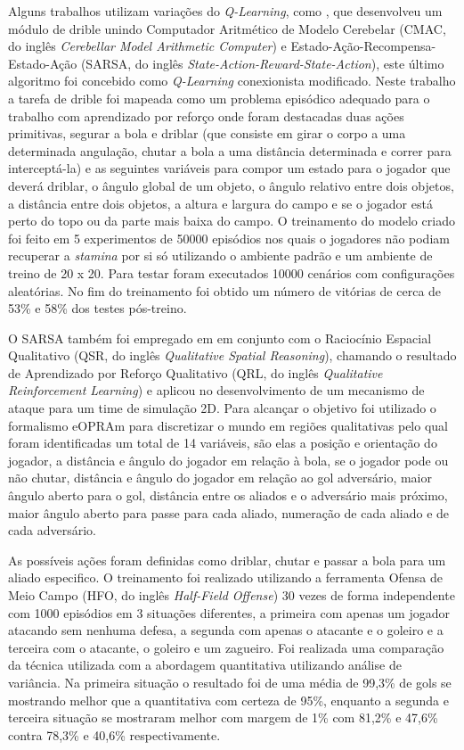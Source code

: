 Alguns trabalhos utilizam variações do \textit{Q-Learning}, como
, que desenvolveu um módulo de drible unindo Computador
Aritmético de Modelo Cerebelar (CMAC, do inglês \textit{Cerebellar Model Arithmetic Computer}) e
Estado-Ação-Recompensa-Estado-Ação (SARSA, do inglês \textit{State-Action-Reward-State-Action}),
este último algoritmo foi concebido como \textit{Q-Learning} conexionista modificado. Neste trabalho
a tarefa de drible foi mapeada como um problema episódico adequado para o trabalho com aprendizado
por reforço onde foram destacadas duas ações primitivas, segurar a bola e driblar (que consiste em
girar o corpo a uma determinada angulação, chutar a bola a uma distância determinada e correr para
interceptá-la) e as seguintes variáveis para compor um estado para o jogador que deverá driblar, o
ângulo global de um objeto, o ângulo relativo entre dois objetos, a distância entre dois objetos, a
altura e largura do campo e se o jogador está perto do topo ou da parte mais baixa do campo. O
treinamento do modelo criado foi feito em 5 experimentos de 50000 episódios nos quais o jogadores
não podiam recuperar a \textit{stamina} por si só utilizando o ambiente padrão e um ambiente de
treino de 20 x 20. Para testar foram executados 10000 cenários com configurações aleatórias. No fim
do treinamento foi obtido um número de vitórias de cerca de 53\% e 58\% dos testes pós-treino.

O SARSA também foi empregado em  em conjunto com o Raciocínio
Espacial Qualitativo (QSR, do inglês \textit{Qualitative Spatial Reasoning}), chamando o resultado
de Aprendizado por Reforço Qualitativo (QRL, do inglês \textit{Qualitative Reinforcement Learning})
e aplicou no desenvolvimento de um mecanismo de ataque para um time de simulação 2D. Para alcançar o
objetivo foi utilizado o formalismo eOPRAm para discretizar o mundo em regiões qualitativas pelo
qual foram identificadas um total de 14 variáveis, são elas a posição e orientação do jogador, a
distância e ângulo do jogador em relação à bola, se o jogador pode ou não chutar, distância e ângulo
do jogador em relação ao gol adversário, maior ângulo aberto para o gol, distância entre os aliados
e o adversário mais próximo, maior ângulo aberto para passe para cada aliado, numeração de cada
aliado e de cada adversário.

As possíveis ações foram definidas como driblar, chutar e passar a bola para um aliado especifico. O
treinamento foi realizado utilizando a ferramenta Ofensa de Meio Campo (HFO, do inglês
\textit{Half-Field Offense}) 30 vezes de forma independente com 1000 episódios em 3 situações
diferentes, a primeira com apenas um jogador atacando sem nenhuma defesa, a segunda com apenas o
atacante e o goleiro e a terceira com o atacante, o goleiro e um zagueiro. Foi realizada uma
comparação da técnica utilizada com a abordagem quantitativa utilizando análise de variância. Na
primeira situação o resultado foi de uma média de 99,3\% de gols se mostrando melhor que a
quantitativa com certeza de 95\%, enquanto a segunda e terceira situação se mostraram melhor com
margem de 1\% com 81,2\% e 47,6\% contra 78,3\% e 40,6\% respectivamente.

